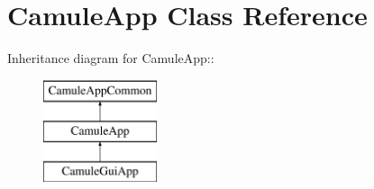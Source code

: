 \section{CamuleApp Class Reference}
\label{classCamuleApp}
Inheritance diagram for CamuleApp::\begin{figure}[H]
\begin{center}
\leavevmode
\includegraphics[height=3cm]{classCamuleApp}
\end{center}
\end{figure}
